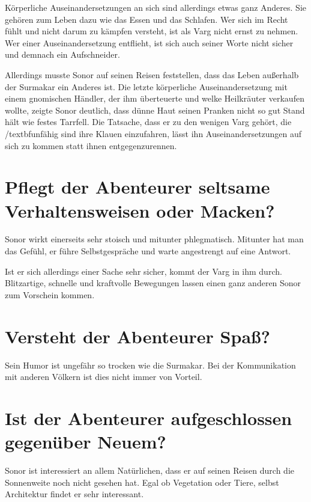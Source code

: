 \documentclass{article}
\begin{document}
	Körperliche Auseinandersetzungen an sich sind allerdings etwas ganz
	Anderes. Sie gehören zum Leben dazu wie das Essen und das Schlafen.
	Wer sich im Recht fühlt und nicht darum zu kämpfen versteht, ist als
	Varg nicht ernst zu nehmen. Wer einer Auseinandersetzung entflieht,
	ist sich auch seiner Worte nicht sicher und demnach ein Aufschneider.

	Allerdings musste Sonor auf seinen Reisen feststellen, dass das Leben
	außerhalb der Surmakar ein Anderes ist. Die letzte körperliche
	Auseinandersetzung mit einem gnomischen Händler, der ihm überteuerte
	und welke Heilkräuter verkaufen wollte, zeigte Sonor deutlich, dass
	dünne Haut seinen Pranken nicht so gut Stand hält wie festes Tarrfell.
	Die Tatsache, dass er zu den wenigen Varg gehört, die /textbf{unfähig}
	sind ihre Klauen einzufahren, lässt ihn Auseinandersetzungen auf sich zu
	kommen statt ihnen entgegenzurennen.


	\section[Macken]{Pflegt der Abenteurer seltsame Verhaltensweisen oder Macken?}



	
	Sonor wirkt einerseits sehr stoisch und mitunter phlegmatisch.
	Mitunter hat man das Gefühl, er führe Selbstgespräche und warte
	angestrengt auf eine Antwort.

	Ist er sich allerdings einer Sache sehr sicher, kommt der Varg in ihm
	durch. Blitzartige, schnelle und kraftvolle Bewegungen lassen einen ganz
	anderen Sonor zum Vorschein kommen.
	

	\section[Humor]{Versteht der Abenteurer Spaß?}
	

	Sein Humor ist ungefähr so trocken wie die Surmakar. Bei der
	Kommunikation mit anderen Völkern ist dies nicht immer von Vorteil.


	\section[Aufgeschlossenheit]{Ist der Abenteurer aufgeschlossen gegenüber Neuem?}
	

	Sonor ist interessiert an allem Natürlichen, dass er auf seinen Reisen
	durch die Sonnenweite noch nicht gesehen hat. Egal ob Vegetation oder
	Tiere, selbst Architektur findet er sehr interessant.
\end{document}
